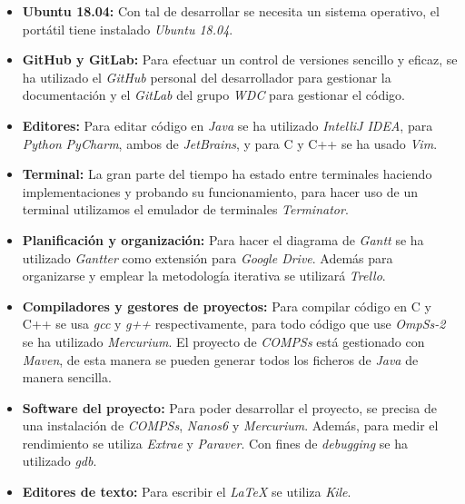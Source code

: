 \begin{itemize}
    \item \textbf{Ubuntu 18.04:} Con tal de desarrollar se necesita un sistema operativo, el portátil tiene instalado \textit{Ubuntu 18.04}.

    \item \textbf{GitHub y GitLab:} Para efectuar un control de versiones sencillo y eficaz, se ha utilizado el \textit{GitHub} personal del desarrollador para gestionar la documentación y el \textit{GitLab} del grupo \textit{WDC} para gestionar el código.

    \item \textbf{Editores: } Para editar código en \textit{Java} se ha utilizado \textit{IntelliJ IDEA}, para \textit{Python} \textit{PyCharm}, ambos de \textit{JetBrains}, y para C y C++ se ha usado \textit{Vim}.

    \item \textbf{Terminal: } La gran parte del tiempo ha estado entre terminales haciendo implementaciones y probando su funcionamiento, para hacer uso de un terminal utilizamos el emulador de terminales \textit{Terminator}.

    \item \textbf{Planificación y organización: } Para hacer el diagrama de \textit{Gantt} se ha utilizado \textit{Gantter} como extensión para \textit{Google Drive}. Además para organizarse y emplear la metodología iterativa se utilizará \textit{Trello}.

    \item \textbf{Compiladores y gestores de proyectos: } Para compilar código en C y C++ se usa \textit{gcc} y \textit{g++} respectivamente, para todo código que use \textit{OmpSs-2} se ha utilizado \textit{Mercurium}. El proyecto de \textit{COMPSs} está gestionado con \textit{Maven}, de esta manera se pueden generar todos los ficheros de \textit{Java} de manera sencilla. 
    
    \item \textbf{Software del proyecto: } Para poder desarrollar el proyecto, se precisa de una instalación de \textit{COMPSs}, \textit{Nanos6} y \textit{Mercurium}. Además, para medir el rendimiento se utiliza \textit{Extrae} y \textit{Paraver}. Con fines de \textit{debugging} se ha utilizado \textit{gdb}.

    \item \textbf{Editores de texto: } Para escribir el \textit{LaTeX} se utiliza \textit{Kile}.
\end{itemize}

